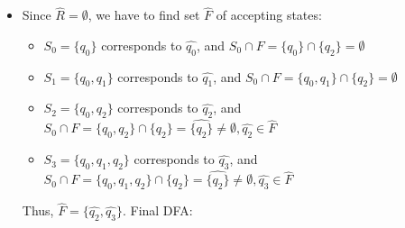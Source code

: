 \documentclass{article}
\begin{document}
\begin{itemize}
    \item Since $\hat{R}=\emptyset$, we have to find set $\hat{F}$ of accepting states:
    \begin{itemize}
        \item $S_0=\{q_0\}$ corresponds to $\hat{q_0}$, and $S_0\cap F=\{q_0\}\cap\{q_2\}=\emptyset$
        \item $S_1=\{q_0,q_1\}$ corresponds to $\hat{q_1}$, and $S_0\cap F=\{q_0,q_1\}\cap\{q_2\}=\emptyset$
        \item $S_2=\{q_0,q_2\}$ corresponds to $\hat{q_2}$, and $S_0\cap F=\{q_0,q_2\}\cap\{q_2\}=\hat{\{q_2\}}\neq\emptyset,\hat{q_2}\in\hat{F}$
        \item $S_3=\{q_0,q_1,q_2\}$ corresponds to $\hat{q_3}$, and $S_0\cap F=\{q_0,q_1,q_2\}\cap\{q_2\}=\hat{\{q_2\}}\neq\emptyset,\hat{q_3}\in\hat{F}$
    \end{itemize}
    Thus, $\hat{F}=\{\hat{q_2},\hat{q_3}\}$. Final DFA:
\end{itemize}
\end{document}
